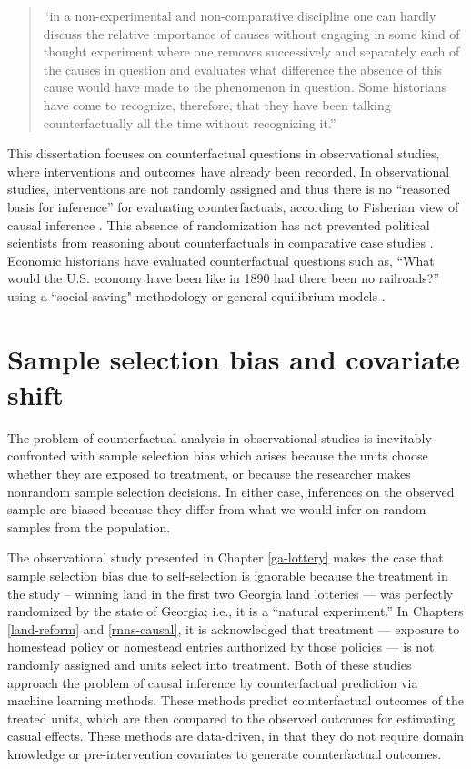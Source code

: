 \begin{quote}
``in a non-experimental and non-comparative discipline one can hardly discuss the
relative importance of causes without engaging in some kind of thought experiment where one removes successively and separately each of the causes in
question and evaluates what difference the absence of this cause would have
made to the phenomenon in question. Some historians have come to recognize,
therefore, that they have been talking counterfactually all the time without
recognizing it.''
\end{quote}

This dissertation focuses on counterfactual questions in observational studies, where interventions and outcomes have already been recorded. In observational studies, interventions are not randomly assigned and thus there is no ``reasoned basis for inference'' for evaluating counterfactuals, according to Fisherian view of causal inference \citep{fisher1935}. This absence of randomization has not prevented political scientists from reasoning about counterfactuals in comparative case studies \citep{fearon1991counterfactuals, tetlock1996counterfactual,abadie2010synthetic,abadie2015comparative}. Economic historians have evaluated counterfactual questions such as, ``What would the U.S. economy have been like in 1890 had there been no railroads?'' using a ``social saving" methodology \citep{fogel1964railroads, donaldson2016railroads} or general equilibrium models \citep{williamson2008late}.

\section{Sample selection bias and covariate shift}
The problem of counterfactual analysis in observational studies is inevitably confronted with sample selection bias \citep{heckman1979sample} which arises because the units choose whether they are exposed to treatment, or because the researcher makes nonrandom sample selection decisions. In either case, inferences on the observed sample are biased because they differ from what we would infer on random samples from the population. 

The observational study presented in Chapter \ref{ga-lottery} makes the case that sample selection bias due to self-selection is ignorable because the treatment in the study -- winning land in the first two Georgia land lotteries --- was perfectly randomized by the state of Georgia; i.e., it is a ``natural experiment.'' In Chapters \ref{land-reform} and \ref{rnns-causal}, it is acknowledged that treatment --- exposure to homestead policy or homestead entries authorized by those policies --- is not randomly assigned and units select into treatment. Both of these studies approach the problem of causal inference by counterfactual prediction via machine learning methods. These methods predict counterfactual outcomes of the treated units, which are then compared to the observed outcomes for estimating casual effects. These methods are data-driven, in that they do not require domain knowledge or pre-intervention covariates to generate counterfactual outcomes.  

